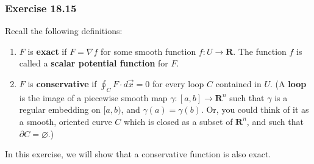 \documentclass{article}
\newcommand{\R}{\mathbf{R}}
\theoremstyle{plain} %
\numberwithin{thm}{section} %
\theoremstyle{definition}
\begin{document}
    \subsubsection{Exercise 18.15}
    Recall the following definitions:
    \begin{enumerate}[label=(\alph*)]
        \item $F$ is \textbf{exact} if $F=\nabla f$ for some smooth function $f:U\rightarrow \R$. The function $f$ is called a \textbf{scalar potential function} for $F$.
        \item $F$ is \textbf{conservative} if $\displaystyle \oint_CF \cdot d\vec{x}=0$ for every loop $C$ contained in $U$. (A \textbf{loop} is the image of a piecewise smooth map $\gamma:[a,b]\rightarrow \R^n$ such that $\gamma$ is a regular embedding on $[a,b)$, and $\gamma(a)=\gamma(b)$. Or, you could think of it as a smooth, oriented curve $C$ which is closed as a subset of $\R^n$, and such that $\partial C = \varnothing$.)
    \end{enumerate}
    In this exercise, we will show that a conservative function is also exact.
\end{document}
